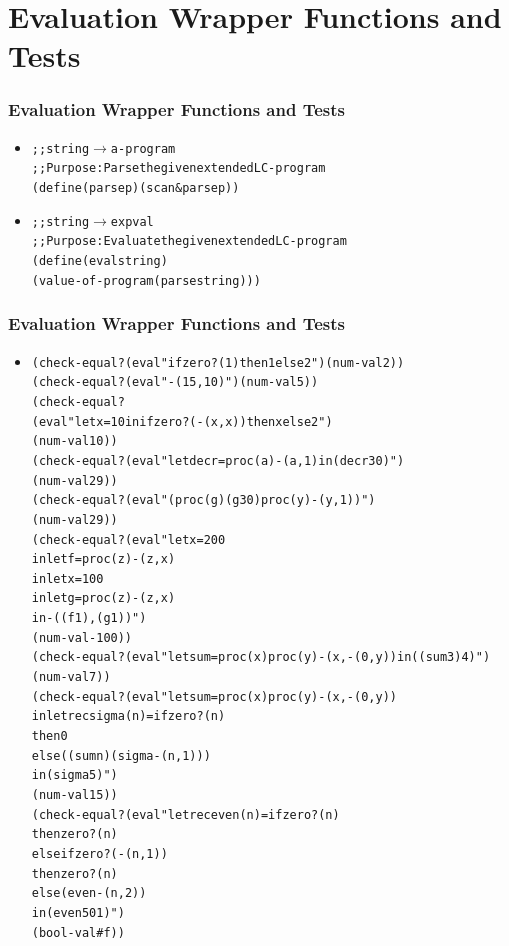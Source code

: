 \documentclass{beamer}
\newcommand{\arrow}{\(\rightarrow\)}
\begin{document}
\section{Evaluation Wrapper Functions and Tests}

\begin{frame}[fragile]
\frametitle{Evaluation Wrapper Functions and Tests}
\begin{scriptsize}
\begin{itemize}
\item<1->
\begin{alltt}
;; string \arrow{} a-program
;; Purpose: Parse the given extended LC-program
(define (parse p) (scan&parse p))
\end{alltt}

\item<2->
\begin{alltt}
;; string \arrow{} expval
;; Purpose: Evaluate the given extended LC-program
(define (eval string)
  (value-of-program (parse string)))
\end{alltt}

\end{itemize}
\end{scriptsize}
\end{frame}

\begin{frame}[fragile]
\frametitle{Evaluation Wrapper Functions and Tests}
\begin{tiny}
\begin{itemize}
\item<1->
\begin{alltt}
(check-equal? (eval "if zero?(1) then 1 else 2") (num-val 2))
(check-equal? (eval "-(15, 10)") (num-val 5))
(check-equal?
 (eval "let x = 10 in if zero?(-(x, x)) then x else 2")
 (num-val 10))
(check-equal? (eval "let decr = proc (a) -(a, 1) in (decr 30)")
              (num-val 29))
(check-equal? (eval "( proc (g) (g 30) proc (y) -(y, 1))")
              (num-val 29))
(check-equal? (eval "let x = 200
                     in let f = proc (z) -(z, x)
                        in let x = 100
                           in let g = proc (z) -(z, x)
                              in -((f 1), (g 1))")
              (num-val -100))
(check-equal? (eval "let sum = proc (x) proc (y) -(x, -(0, y)) in ((sum 3) 4)")
              (num-val 7))
(check-equal? (eval "let sum = proc (x) proc (y) -(x, -(0, y))
                     in letrec sigma (n) = if zero?(n)
                                           then 0
                                           else ((sum n) (sigma -(n, 1)))
                        in (sigma 5)")
              (num-val 15))
(check-equal? (eval "letrec even(n) = if zero?(n)
                                      then zero?(n)
                                      else if zero?(-(n, 1))
                                           then zero?(n)
                                           else (even -(n, 2))
                     in (even 501)")
              (bool-val #f))
\end{alltt}

\end{itemize}
\end{tiny}
\end{frame}
\end{document}
